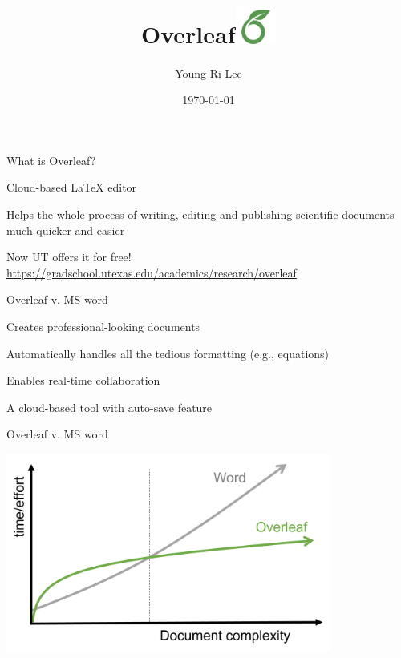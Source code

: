 \documentclass[13pt]{beamer}
\title{Overleaf\includegraphics[width=0.1\textwidth,keepaspectratio]{images/overleaf_og_logo.png}}
\author{Young Ri Lee}
\institute{QM Colloquium \\ The University of Texas at Austin}
\date{\today}
\newcommand{\itemA}{\item[\textcolor{black}{\textbullet}]}
\newcommand{\green}{\textcolor{colorgreen}}
\begin{document}
\begin{frame}[plain]
\maketitle
\end{frame}

\begin{frame}{What is Overleaf?}
 \begin{fullpageitemize}
    \itemA Cloud-based LaTeX editor
    \itemA Helps the whole process of writing, editing and publishing scientific documents much quicker and easier
    \itemA Now UT offers it for free!\\
    \green{\footnotesize{\url{https://gradschool.utexas.edu/academics/research/overleaf}}} \hfill \break
 \end{fullpageitemize}
 
\end{frame}

\begin{frame}{Overleaf v. MS word}

\begin{fullpageitemize}
    \itemA Creates professional-looking documents  \green{} 
    \itemA Automatically handles all the tedious formatting (e.g., equations) \green{} 
    \itemA Enables real-time collaboration \green{} 
    \itemA A cloud-based tool with auto-save feature \green{} 
    
 \end{fullpageitemize}
\end{frame}

\begin{frame}{Overleaf v. MS word}

\includegraphics[width=0.8\textwidth,keepaspectratio]{images/v_word.png}
\end{frame}
\end{document}
